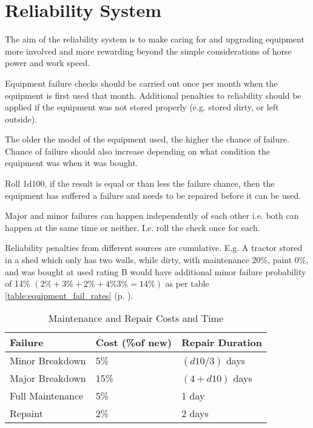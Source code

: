 \documentclass[a4paper,10pt]{article}
\begin{document}
\section{Reliability System}
The aim of the reliability system is to make caring for and upgrading equipment
more involved and more rewarding beyond the simple considerations of horse power
and work speed.

Equipment failure checks should be carried out once per month when the equipment
is first used that month. Additional penalties to reliability should be applied
if the equipment was not stored properly (e.g. stored dirty, or left outside).

The older the model of the equipment used, the higher the chance of failure.
Chance of failure should also increase depending on what condition the equipment
was when it was bought.

Roll 1d100, if the result is equal or than less the failure chance, then the
equipment has suffered a failure and needs to be repaired before it can be used.

Major and minor failures can happen independently of each other i.e. both can
happen at the same time or neither. I.e. roll the check once for each.

Reliability penalties from different sources are cumulative. E.g. A tractor
stored in a shed which only has two walls, while dirty, with maintenance 20\%,
paint 0\%, and was bought at used rating B would have additional minor failure
probability of 14\% $(2\% + 3\% + 2\% + 4\% 3\% = 14\%)$ as per table
\ref{table:equipment_fail_rates} (p. \pageref{table:equipment_fail_rates}).


\begin{table}
  \caption{Maintenance and Repair Costs and Time}
  \begin{tabular}{lll}
    \toprule
    Failure          & Cost (\%of new) & Repair Duration  \\
    \midrule
    Minor Breakdown  & 5\%             & $(d10 / 3)$ days\\
    Major Breakdown  & 15\%            & $(4 + d10)$ days \\
    Full Maintenance & 5\%             & 1 day\\
    Repaint          & 2\%             & 2 days\\
    \bottomrule
  \end{tabular}
\end{table}
\end{document}
